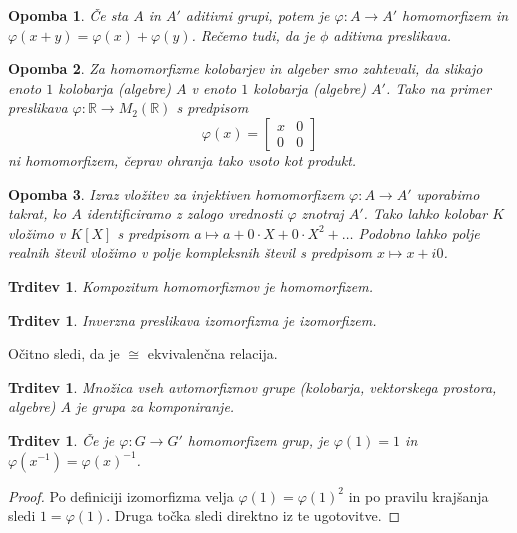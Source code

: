 \documentclass[10pt, a4paper]{article}
\newtheorem{trditev}[izr]{Trditev}
\newtheorem*{opomba}{Opomba}
\newenvironment{noticeC}{%
  \tcolorbox[%
  notitle,
  empty,
  enhanced,  %
  breakable,
  coltext=black, 
  fontupper=\rmfamily,
  noparskip,
  sharp corners,
  boxrule=-1pt,  %
  frame hidden,
  left=7pt,  %
  right=7pt,
  top=5pt,
  bottom=5pt,
  before skip=2.5ex plus 2pt,
  after skip=2.5ex plus 2pt,
  overlay unbroken and last={%
  },
  ]}
{\endtcolorbox}
\newenvironment{dokaz}%
  {\begin{noticeC}\begin{proof}}%
  {\end{proof}\end{noticeC}}
\newcommand{\R}{\mathbb {R}}
\begin{document}
\begin{opomba}
  Če sta $A$ in $A'$ aditivni grupi, potem je $\varphi: A \to A'$ homomorfizem in $\varphi(x + y) = \varphi(x) + \varphi(y)$.
  Rečemo tudi, da je $\phi$ aditivna preslikava.
\end{opomba}

\begin{opomba}
  Za homomorfizme kolobarjev in algeber smo zahtevali, da slikajo enoto $1$ kolobarja (algebre) $A$ 
  v enoto $1$ kolobarja (algebre) $A'$. Tako na primer preslikava $\varphi: \R \to M_2 (\R)$ s predpisom 
  $$\varphi(x) = \begin{bmatrix}
    x & 0\\
    0 & 0
  \end{bmatrix}$$ ni homomorfizem, čeprav ohranja tako vsoto kot produkt.
\end{opomba}

\begin{opomba}
  Izraz vložitev za injektiven homomorfizem $\varphi: A \to A'$ uporabimo takrat, 
  ko $A$ identificiramo z zalogo vrednosti $\varphi$ znotraj $A'$.
  Tako lahko kolobar $K$ vložimo v $K[X]$ s predpisom $a \mapsto a + 0\cdot X + 0 \cdot X^2 + \dots$
  Podobno lahko polje realnih števil vložimo v polje kompleksnih števil s predpisom $x \mapsto x + i0$.
\end{opomba}

\begin{trditev}
  Kompozitum homomorfizmov je homomorfizem.
\end{trditev}

\begin{trditev}
  Inverzna preslikava izomorfizma je izomorfizem.
\end{trditev}

Očitno sledi, da je $\cong$ ekvivalenčna relacija.

\begin{trditev}
  Množica vseh avtomorfizmov grupe (kolobarja, vektorskega prostora, algebre) $A$ je grupa za komponiranje.
\end{trditev}

\begin{trditev}
  Če je $\varphi: G \to G'$ homomorfizem grup, je $\varphi(1) = 1$ in $\varphi(x^{-1}) = \varphi(x)^{-1}$.
\end{trditev}

\begin{dokaz}
  Po definiciji izomorfizma velja $\varphi(1) = \varphi(1)^2$ in po pravilu krajšanja sledi $1 = \varphi(1)$.
  Druga točka sledi direktno iz te ugotovitve.
\end{dokaz}
\end{document}
